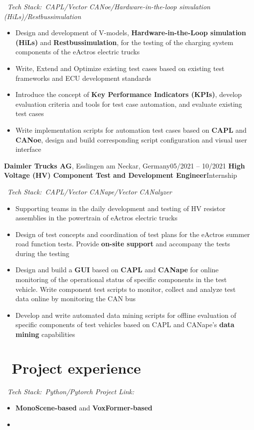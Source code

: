 \documentclass{resume}
\begin{document}
\ \textit{Tech Stack:\ CAPL/Vector CANoe/Hardware-in-the-loop simulation (HiLs)/Restbussimulation}
\begin{itemize}
  \item Design and development of V-models, \textbf{Hardware-in-the-Loop simulation (HiLs)} and \textbf{Restbussimulation}, for the testing of the charging system components of the eActros electric trucks
  \item Write, Extend and Optimize existing test cases based on existing test frameworks and ECU development standards
  \item Introduce the concept of \textbf{Key Performance Indicators (KPIs)}, develop evaluation criteria and tools for test case automation, and evaluate existing test cases
  \item Write implementation scripts for automation test cases based on \textbf{CAPL} and \textbf{CANoe}, design and build corresponding script configuration and visual user interface
\end{itemize}
\vspace{0.15cm}

\worksubsection
  {\textbf{Daimler Trucks AG}, Esslingen am Neckar, Germany}{05/2021 -- 10/2021}
\workpossubsection
  {\textbf{High Voltage (HV) Component Test and Development Engineer}}{Internship}

\ \textit{Tech Stack:\ CAPL/Vector CANape/Vector CANalyzer}
\begin{itemize}
  \item Supporting teams in the daily development and testing of HV resistor assemblies in the powertrain of eActros electric trucks
  \item Design of test concepts and coordination of test plans for the eActros summer road function tests. Provide \textbf{on-site support} and accompany the tests during the testing
  \item Design and build a \textbf{GUI} based on \textbf{CAPL} and \textbf{CANape} for online monitoring of the operational status of specific components in the test vehicle. Write component test scripts to monitor, collect and analyze test data online by monitoring the CAN bus
  \item Develop and write automated data mining scripts for offline evaluation of specific components of test vehicles based on CAPL and CANape's \textbf{data mining} capabilities
\end{itemize}
\vspace{0.15cm}

\section{\faFolder\ Project experience}
\ \textit{Tech Stack:\ Python/Pytorch \hfill Project Link:\ }
\begin{itemize}
  \item \textbf{MonoScene-based} and \textbf{VoxFormer-based}
  \item
\end{itemize}
\end{document}
